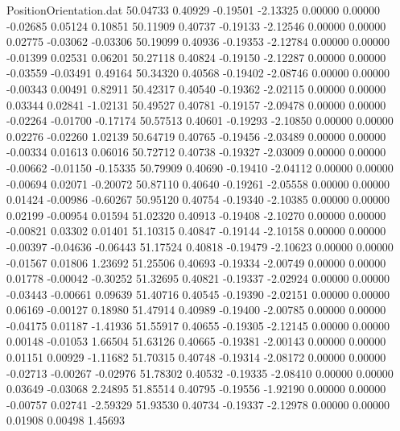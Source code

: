 \begin{filecontents}{PositionOrientation.dat}
  50.04733    0.40929   -0.19501    -2.13325    0.00000    0.00000   -0.02685    0.05124    0.10851
  50.11909    0.40737   -0.19133    -2.12546    0.00000    0.00000    0.02775   -0.03062   -0.03306
  50.19099    0.40936   -0.19353    -2.12784    0.00000    0.00000   -0.01399    0.02531    0.06201
  50.27118    0.40824   -0.19150    -2.12287    0.00000    0.00000   -0.03559   -0.03491    0.49164
  50.34320    0.40568   -0.19402    -2.08746    0.00000    0.00000   -0.00343    0.00491    0.82911
  50.42317    0.40540   -0.19362    -2.02115    0.00000    0.00000    0.03344    0.02841   -1.02131
  50.49527    0.40781   -0.19157    -2.09478    0.00000    0.00000   -0.02264   -0.01700   -0.17174
  50.57513    0.40601   -0.19293    -2.10850    0.00000    0.00000    0.02276   -0.02260    1.02139
  50.64719    0.40765   -0.19456    -2.03489    0.00000    0.00000   -0.00334    0.01613    0.06016
  50.72712    0.40738   -0.19327    -2.03009    0.00000    0.00000   -0.00662   -0.01150   -0.15335
  50.79909    0.40690   -0.19410    -2.04112    0.00000    0.00000   -0.00694    0.02071   -0.20072
  50.87110    0.40640   -0.19261    -2.05558    0.00000    0.00000    0.01424   -0.00986   -0.60267
  50.95120    0.40754   -0.19340    -2.10385    0.00000    0.00000    0.02199   -0.00954    0.01594
  51.02320    0.40913   -0.19408    -2.10270    0.00000    0.00000   -0.00821    0.03302    0.01401
  51.10315    0.40847   -0.19144    -2.10158    0.00000    0.00000   -0.00397   -0.04636   -0.06443
  51.17524    0.40818   -0.19479    -2.10623    0.00000    0.00000   -0.01567    0.01806    1.23692
  51.25506    0.40693   -0.19334    -2.00749    0.00000    0.00000    0.01778   -0.00042   -0.30252
  51.32695    0.40821   -0.19337    -2.02924    0.00000    0.00000   -0.03443   -0.00661    0.09639
  51.40716    0.40545   -0.19390    -2.02151    0.00000    0.00000    0.06169   -0.00127    0.18980
  51.47914    0.40989   -0.19400    -2.00785    0.00000    0.00000   -0.04175    0.01187   -1.41936
  51.55917    0.40655   -0.19305    -2.12145    0.00000    0.00000    0.00148   -0.01053    1.66504
  51.63126    0.40665   -0.19381    -2.00143    0.00000    0.00000    0.01151    0.00929   -1.11682
  51.70315    0.40748   -0.19314    -2.08172    0.00000    0.00000   -0.02713   -0.00267   -0.02976
  51.78302    0.40532   -0.19335    -2.08410    0.00000    0.00000    0.03649   -0.03068    2.24895
  51.85514    0.40795   -0.19556    -1.92190    0.00000    0.00000   -0.00757    0.02741   -2.59329
  51.93530    0.40734   -0.19337    -2.12978    0.00000    0.00000    0.01908    0.00498    1.45693

\end{filecontents}
